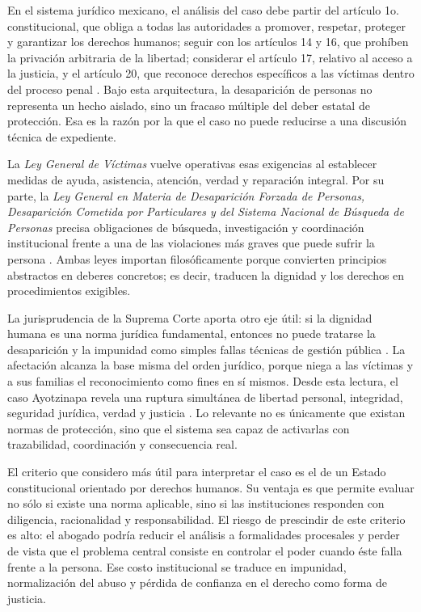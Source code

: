 \documentclass[
	spanish,
	letterpaper, oneside
]{article}
\begin{document}
En el sistema jurídico mexicano, el análisis del caso debe partir del artículo 1o. constitucional, que obliga a todas las autoridades a promover, respetar, proteger y garantizar los derechos humanos; seguir con los artículos 14 y 16, que prohíben la privación arbitraria de la libertad; considerar el artículo 17, relativo al acceso a la justicia, y el artículo 20, que reconoce derechos específicos a las víctimas dentro del proceso penal \citep{cpeum2026}. Bajo esta arquitectura, la desaparición de personas no representa un hecho aislado, sino un fracaso múltiple del deber estatal de protección. Esa es la razón por la que el caso no puede reducirse a una discusión técnica de expediente.

La \textit{Ley General de Víctimas} vuelve operativas esas exigencias al establecer medidas de ayuda, asistencia, atención, verdad y reparación integral. Por su parte, la \textit{Ley General en Materia de Desaparición Forzada de Personas, Desaparición Cometida por Particulares y del Sistema Nacional de Búsqueda de Personas} precisa obligaciones de búsqueda, investigación y coordinación institucional frente a una de las violaciones más graves que puede sufrir la persona \citep{LeyGeneralVictimas,lgmdfp2026}. Ambas leyes importan filosóficamente porque convierten principios abstractos en deberes concretos; es decir, traducen la dignidad y los derechos en procedimientos exigibles.

La jurisprudencia de la Suprema Corte aporta otro eje útil: si la dignidad humana es una norma jurídica fundamental, entonces no puede tratarse la desaparición y la impunidad como simples fallas técnicas de gestión pública \citep{scjnJur37_2016}. La afectación alcanza la base misma del orden jurídico, porque niega a las víctimas y a sus familias el reconocimiento como fines en sí mismos. Desde esta lectura, el caso Ayotzinapa revela una ruptura simultánea de libertad personal, integridad, seguridad jurídica, verdad y justicia \citep{casoAyotzinapaCNDH2024}. Lo relevante no es únicamente que existan normas de protección, sino que el sistema sea capaz de activarlas con trazabilidad, coordinación y consecuencia real.

El criterio que considero más útil para interpretar el caso es el de un Estado constitucional orientado por derechos humanos. Su ventaja es que permite evaluar no sólo si existe una norma aplicable, sino si las instituciones responden con diligencia, racionalidad y responsabilidad. El riesgo de prescindir de este criterio es alto: el abogado podría reducir el análisis a formalidades procesales y perder de vista que el problema central consiste en controlar el poder cuando éste falla frente a la persona. Ese costo institucional se traduce en impunidad, normalización del abuso y pérdida de confianza en el derecho como forma de justicia.
\end{document}
